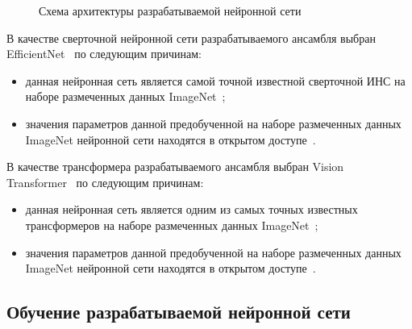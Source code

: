 \begin{figure}[h]
	\caption{Схема архитектуры разрабатываемой нейронной сети}
	\label{img:nn}
\end{figure}

В качестве сверточной нейронной сети разрабатываемого ансамбля выбран EfficientNet~\cite{efficientnet} по следующим причинам:
\begin{itemize}
	\item данная нейронная сеть является самой точной известной сверточной ИНС на наборе размеченных данных ImageNet~\cite{efficientnet};
	\item значения параметров данной предобученной на наборе размеченных данных ImageNet нейронной сети находятся в открытом доступе~\cite{efficientnet-weights}.
\end{itemize}

В качестве трансформера разрабатываемого ансамбля выбран Vision Transformer~\cite{vit} по следующим причинам:
\begin{itemize}
	\item данная нейронная сеть является одним из самых точных известных трансформеров на наборе размеченных данных ImageNet~\cite{vit};
	\item значения параметров данной предобученной на наборе размеченных данных ImageNet нейронной сети находятся в открытом доступе~\cite{vit-weights}.
\end{itemize}


\subsection{Обучение разрабатываемой нейронной сети}
\label{sec:training}

